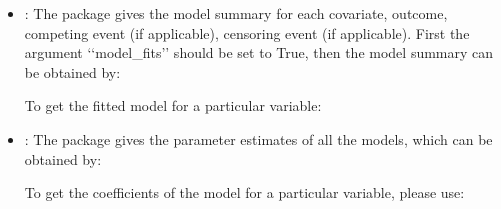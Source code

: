 \documentclass[letterpaper,10pt,english]{sphinxmanual}
\begin{document}
\begin{itemize}
\item {} 
\sphinxAtStartPar
{}: The package gives the model summary for each covariate, outcome,
competing event (if applicable), censoring event (if applicable).
First the argument ‘‘model\_fits’’ should be set to True, then the model summary can be obtained by:
\begin{quote}

\begin{sphinxVerbatim}[commandchars=\\\{\}]
  \PYG{p}{[}\PYG{p}{]}
\end{sphinxVerbatim}
\end{quote}

\sphinxAtStartPar
To get the fitted model for a particular variable:
\begin{quote}

\begin{sphinxVerbatim}[commandchars=\\\{\}]
  \PYG{p}{[}\PYG{p}{]}\PYG{p}{[}\PYG{p}{]}
\end{sphinxVerbatim}
\end{quote}

\item {} 
\sphinxAtStartPar
{}: The package gives the parameter estimates of all the models, which can be obtained by:
\begin{quote}

\begin{sphinxVerbatim}[commandchars=\\\{\}]
  \PYG{p}{[}\PYG{p}{]}
\end{sphinxVerbatim}
\end{quote}

\sphinxAtStartPar
To get the coefficients of the model for a particular variable, please use:
\begin{quote}

\begin{sphinxVerbatim}[commandchars=\\\{\}]
  \PYG{p}{[}\PYG{p}{]}\PYG{p}{[}\PYG{p}{]}
\end{sphinxVerbatim}
\end{quote}


\end{itemize}
\end{document}

